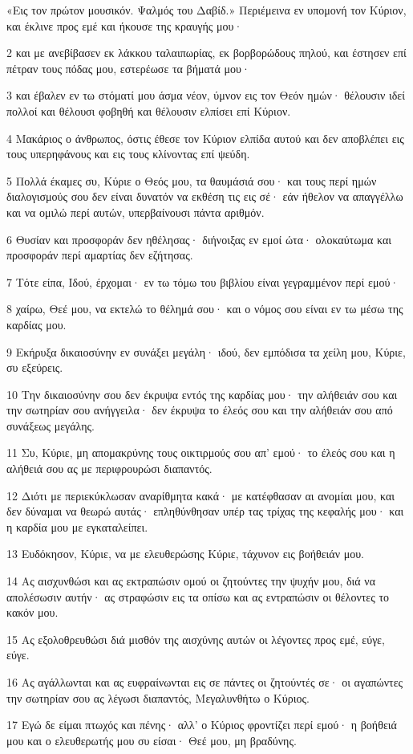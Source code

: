 \par «Εις τον πρώτον μουσικόν. Ψαλμός του Δαβίδ.» Περιέμεινα εν υπομονή τον Κύριον, και έκλινε προς εμέ και ήκουσε της κραυγής μου·
\par 2 και με ανεβίβασεν εκ λάκκου ταλαιπωρίας, εκ βορβορώδους πηλού, και έστησεν επί πέτραν τους πόδας μου, εστερέωσε τα βήματά μου·
\par 3 και έβαλεν εν τω στόματί μου άσμα νέον, ύμνον εις τον Θεόν ημών· θέλουσιν ιδεί πολλοί και θέλουσι φοβηθή και θέλουσιν ελπίσει επί Κύριον.
\par 4 Μακάριος ο άνθρωπος, όστις έθεσε τον Κύριον ελπίδα αυτού και δεν αποβλέπει εις τους υπερηφάνους και εις τους κλίνοντας επί ψεύδη.
\par 5 Πολλά έκαμες συ, Κύριε ο Θεός μου, τα θαυμάσιά σου· και τους περί ημών διαλογισμούς σου δεν είναι δυνατόν να εκθέση τις εις σέ· εάν ήθελον να απαγγέλλω και να ομιλώ περί αυτών, υπερβαίνουσι πάντα αριθμόν.
\par 6 Θυσίαν και προσφοράν δεν ηθέλησας· διήνοιξας εν εμοί ώτα· ολοκαύτωμα και προσφοράν περί αμαρτίας δεν εζήτησας.
\par 7 Τότε είπα, Ιδού, έρχομαι· εν τω τόμω του βιβλίου είναι γεγραμμένον περί εμού·
\par 8 χαίρω, Θεέ μου, να εκτελώ το θέλημά σου· και ο νόμος σου είναι εν τω μέσω της καρδίας μου.
\par 9 Εκήρυξα δικαιοσύνην εν συνάξει μεγάλη· ιδού, δεν εμπόδισα τα χείλη μου, Κύριε, συ εξεύρεις.
\par 10 Την δικαιοσύνην σου δεν έκρυψα εντός της καρδίας μου· την αλήθειάν σου και την σωτηρίαν σου ανήγγειλα· δεν έκρυψα το έλεός σου και την αλήθειάν σου από συνάξεως μεγάλης.
\par 11 Συ, Κύριε, μη απομακρύνης τους οικτιρμούς σου απ' εμού· το έλεός σου και η αλήθειά σου ας με περιφρουρώσι διαπαντός.
\par 12 Διότι με περιεκύκλωσαν αναρίθμητα κακά· με κατέφθασαν αι ανομίαι μου, και δεν δύναμαι να θεωρώ αυτάς· επληθύνθησαν υπέρ τας τρίχας της κεφαλής μου· και η καρδία μου με εγκαταλείπει.
\par 13 Ευδόκησον, Κύριε, να με ελευθερώσης Κύριε, τάχυνον εις βοήθειάν μου.
\par 14 Ας αισχυνθώσι και ας εκτραπώσιν ομού οι ζητούντες την ψυχήν μου, διά να απολέσωσιν αυτήν· ας στραφώσιν εις τα οπίσω και ας εντραπώσιν οι θέλοντες το κακόν μου.
\par 15 Ας εξολοθρευθώσι διά μισθόν της αισχύνης αυτών οι λέγοντες προς εμέ, εύγε, εύγε.
\par 16 Ας αγάλλωνται και ας ευφραίνωνται εις σε πάντες οι ζητούντές σε· οι αγαπώντες την σωτηρίαν σου ας λέγωσι διαπαντός, Μεγαλυνθήτω ο Κύριος.
\par 17 Εγώ δε είμαι πτωχός και πένης· αλλ' ο Κύριος φροντίζει περί εμού· η βοήθειά μου και ο ελευθερωτής μου συ είσαι· Θεέ μου, μη βραδύνης.

